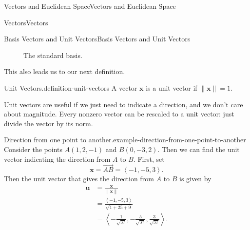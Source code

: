 \documentclass[10pt,]{book}
\numberwithin{equation}{section}
\newcommand{\vv}[1]{\mathbf{#1}}
\newcommand{\dotprod}[1]{\left\langle #1 \right\rangle}
\begin{document}
\begin{chapterptx}{Vectors and Euclidean Space}{}{Vectors and Euclidean Space}{}{}
\begin{sectionptx}{Vectors}{}{Vectors}{}{}
\begin{subsectionptx}{Basis Vectors and Unit Vectors}{}{Basis Vectors and Unit Vectors}{}{}
\begin{figure}
{
}
\caption{The standard basis.\label{figure-standard-basis}}
\end{figure}
\hypertarget{p-894}{}%
This also leads us to our next definition.%
\begin{definition}{Unit Vectors.}{definition-unit-vectors}%
\hypertarget{p-895}{}%
A vector \(\vv{x}\) is a unit vector if \(\|\vv{x}\| = 1\).%
\end{definition}
\hypertarget{p-896}{}%
Unit vectors are useful if we just need to indicate a direction, and we don't care about magnitude. Every nonzero vector can be rescaled to a unit vector: just divide the vector by its norm.%
\begin{example}{Direction from one point to another.}{example-direction-from-one-point-to-another}%
\hypertarget{p-897}{}%
Consider the points \(A(1,2,-1)\) and \(B(0,-3,2)\). Then we can find the unit vector indicating the direction from \(A\) to \(B\). First, set%
%
\begin{equation*}
\vv{x} = \overrightarrow{AB} = \dotprod{-1,-5,3}.
\end{equation*}
\hypertarget{p-898}{}%
Then the unit vector that gives the direction from \(A\) to \(B\) is given by%
%
\begin{align*}
\vv{u} & = \frac{\vv{x}}{\|\vv{x}\|} \\
& = \frac{\dotprod{-1,-5,3}}{\sqrt{1+25+9}} \\
& = \dotprod{-\frac{1}{\sqrt{37}}, -\frac{5}{\sqrt{37}}, \frac{3}{\sqrt{37}}}. 

\end{align*}
\end{example}
\end{subsectionptx}
\end{sectionptx}
\end{chapterptx}
\end{document}

